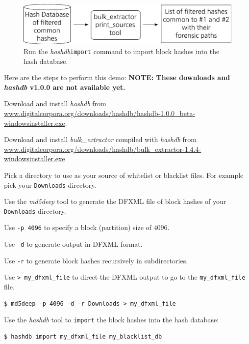 \documentclass[12pt,twoside]{article}
\newcommand{\hdb}{\emph{hashdb}\xspace}
\newcommand{\bulk}{\emph{bulk\_extractor}\xspace}
\newcommand{\mdd}{\emph{md5deep}\xspace}
\begin{document}
\begin{figure}[H]
  \center
  \includegraphics[scale=0.6]{drawings/import}
  \caption*{Run the \hdb \texttt{import} command
            to import block hashes into the hash database.}
\end{figure}


Here are the steps to perform this demo:
\textbf{NOTE: These downloads and \hdb v1.0.0 are not available yet.}
\begin{compactenum}
\item Download and install \hdb from
\url{www.digitalcorpora.org/downloads/hashdb/hashdb-1.0.0\_beta-windowsinstaller.exe}.
\item Download and install \bulk compiled with \hdb from
\url{www.digitalcorpora.org/downloads/hashdb/bulk\_extractor-1.4.4-windowsinstaller.exe}
\item Pick a directory to use as your source of whitelist or blacklist files.
For example pick your \texttt{Downloads} directory.

\item Use the \mdd tool to generate the DFXML file of block hashes
of your \texttt{Downloads} directory.
\begin{compactitem}
\item Use \texttt{-p 4096} to specify a block (partition) size of 4096.
\item Use \texttt{-d} to generate output in DFXML format.
\item Use \texttt{-r} to generate block hashes recursively in subdirectories.
\item Use \texttt{> my\_dfxml\_file} to direct the DFXML output
to go to the \texttt{my\_dfxml\_file} file.
\end{compactitem}
\begin{verbatim}
$ md5deep -p 4096 -d -r Downloads > my_dfxml_file
\end{verbatim}

\item Use the \hdb tool to \texttt{import} the block hashes
into the hash database:
\begin{verbatim}
$ hashdb import my_dfxml_file my_blacklist_db
\end{verbatim}
\end{compactenum}
\end{document}
